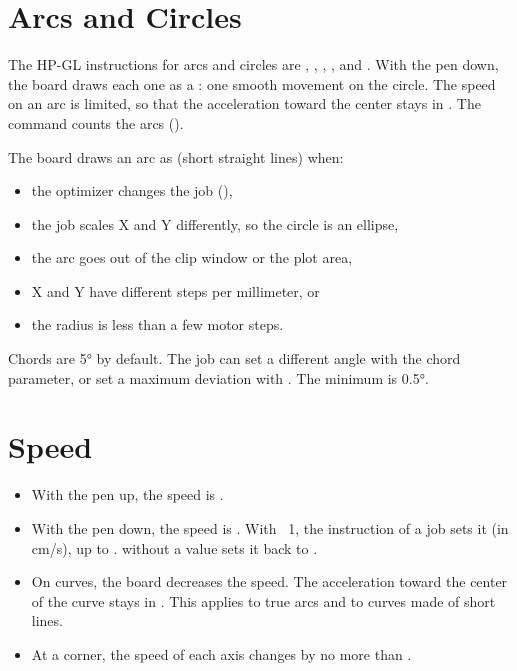 \section{Arcs and Circles}

The HP-GL instructions for arcs and circles are , ,
, , and . With the pen down, the board draws each one
as a : one smooth movement on the circle. The speed on an arc
is limited, so that the acceleration toward the center stays in
. The  command counts the arcs ().

The board draws an arc as  (short straight lines) when:

\begin{itemize}
  \item the optimizer changes the job (),
  \item the job scales X and Y differently, so the circle is an ellipse,
  \item the arc goes out of the clip window or the plot area,
  \item X and Y have different steps per millimeter, or
  \item the radius is less than a few motor steps.
\end{itemize}

Chords are 5° by default. The job can set a different angle with the chord
parameter, or set a maximum deviation with . The minimum is 0.5°.

\section{Speed}

\begin{itemize}
  \item With the pen up, the speed is .
  \item With the pen down, the speed is . With ~1,
        the  instruction of a job sets it (in cm/s), up to .
         without a value sets it back to .
  \item On curves, the board decreases the speed. The acceleration toward the
        center of the curve stays in . This applies to true
        arcs and to curves made of short lines.
  \item At a corner, the speed of each axis changes by no more than
        .
\end{itemize}


